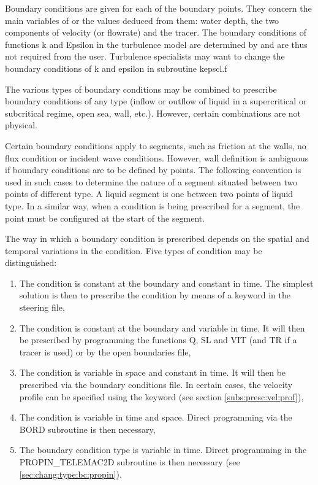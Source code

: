  Boundary conditions are given for each of the boundary points. They concern the main variables of  or the values deduced from them: water depth, the two components of velocity (or flowrate) and the tracer. The boundary conditions of functions k and Epsilon in the turbulence model are determined by  and are thus not required from the user. Turbulence specialists may want to change the boundary conditions of k and epsilon in subroutine kepscl.f

 The various types of boundary conditions may be combined to prescribe boundary conditions of any type (inflow or outflow of liquid in a supercritical or subcritical regime, open sea, wall, etc.). However, certain combinations are not physical.

 Certain boundary conditions apply to segments, such as friction at the walls, no flux condition or incident wave conditions. However, wall definition is ambiguous if boundary conditions are to be defined by points. The following convention is used in such cases to determine the nature of a segment situated between two points of different type. A liquid segment is one between two points of liquid type. In a similar way, when a condition is being prescribed for a segment, the point must be configured at the start of the segment.

 The way in which a boundary condition is prescribed depends on the spatial and temporal variations in the condition. Five types of condition may be distinguished:

\begin{enumerate}
\item  The condition is constant at the boundary and constant in time. The simplest solution is then to prescribe the condition by means of a keyword in the steering file,

\item  The condition is constant at the boundary and variable in time. It will then be prescribed by programming the functions Q, SL and VIT (and TR if a tracer is used) or by the open boundaries file,

\item  The condition is variable in space and constant in time. It will then be prescribed via the boundary conditions file. In certain cases, the velocity profile can be specified using the keyword  (see section \ref{subs:presc:vel:prof}),

\item  The condition is variable in time and space. Direct programming via the BORD subroutine is then necessary,

\item  The boundary condition type is variable in time. Direct programming in the PROPIN\_TELEMAC2D subroutine is then necessary (see \ref{sec:chang:type:bc:propin}).
\end{enumerate}

